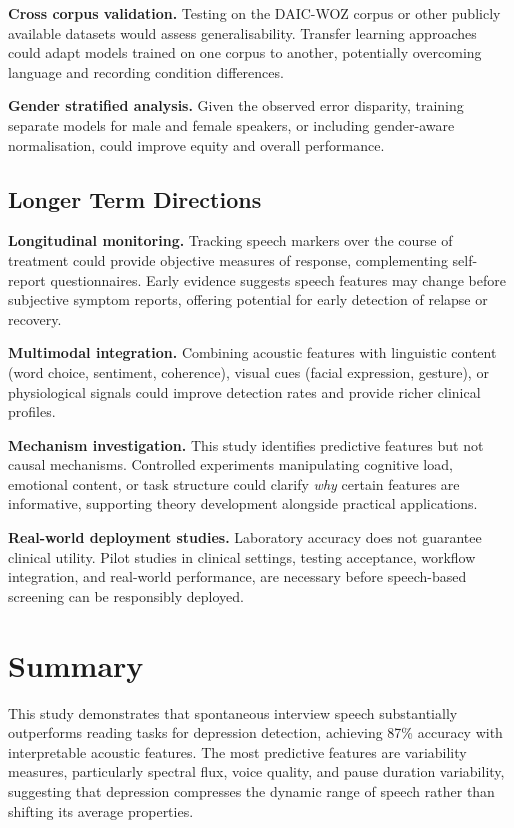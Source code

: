 \textbf{Cross corpus validation.} Testing on the DAIC-WOZ corpus or other publicly available datasets would assess generalisability. Transfer learning approaches could adapt models trained on one corpus to another, potentially overcoming language and recording condition differences.

\textbf{Gender stratified analysis.} Given the observed error disparity, training separate models for male and female speakers, or including gender-aware normalisation, could improve equity and overall performance.

\subsection{Longer Term Directions}

\textbf{Longitudinal monitoring.} Tracking speech markers over the course of treatment could provide objective measures of response, complementing self-report questionnaires. Early evidence suggests speech features may change before subjective symptom reports, offering potential for early detection of relapse or recovery.

\textbf{Multimodal integration.} Combining acoustic features with linguistic content (word choice, sentiment, coherence), visual cues (facial expression, gesture), or physiological signals could improve detection rates and provide richer clinical profiles.

\textbf{Mechanism investigation.} This study identifies predictive features but not causal mechanisms. Controlled experiments manipulating cognitive load, emotional content, or task structure could clarify \textit{why} certain features are informative, supporting theory development alongside practical applications.

\textbf{Real-world deployment studies.} Laboratory accuracy does not guarantee clinical utility. Pilot studies in clinical settings, testing acceptance, workflow integration, and real-world performance, are necessary before speech-based screening can be responsibly deployed.

\section{Summary}

This study demonstrates that spontaneous interview speech substantially outperforms reading tasks for depression detection, achieving 87\% accuracy with interpretable acoustic features. The most predictive features are variability measures, particularly spectral flux, voice quality, and pause duration variability, suggesting that depression compresses the dynamic range of speech rather than shifting its average properties.

